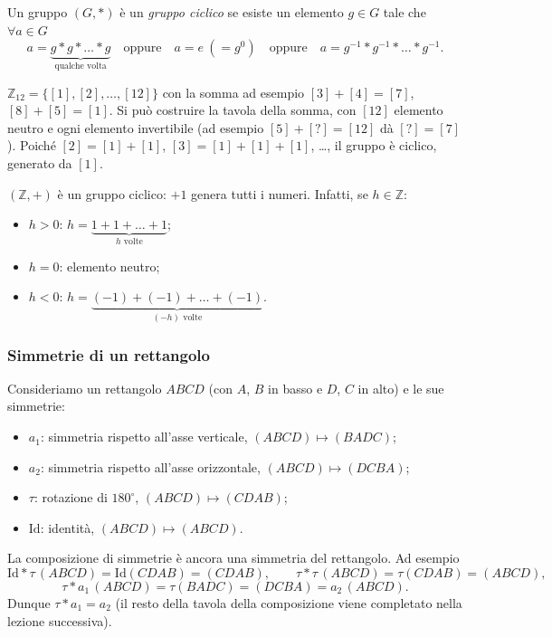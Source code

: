 \documentclass[11pt,a4paper]{article}
\begin{document}
\begin{definizione}
Un gruppo $(G, *)$ è un \emph{gruppo ciclico} se esiste un elemento $g \in G$ tale che $\forall a \in G$
\[
  a = \underbrace{g * g * \dots * g}_{\text{qualche volta}}
  \quad\text{oppure}\quad a = e\ (= g^0)
  \quad\text{oppure}\quad a = g^{-1} * g^{-1} * \dots * g^{-1} .
\]
\end{definizione}

\begin{esempio}
$\mathbb{Z}_{12} = \{[1], [2], \dots, [12]\}$ con la somma ad esempio $[3] + [4] = [7]$, $[8] + [5] = [1]$. Si può costruire la tavola della somma, con $[12]$ elemento neutro e ogni elemento invertibile (ad esempio $[5] + [?] = [12]$ dà $[?] = [7]$). Poiché $[2] = [1] + [1]$, $[3] = [1] + [1] + [1]$, \dots, il gruppo è ciclico, generato da $[1]$.
\end{esempio}

\begin{esempio}
$(\mathbb{Z}, +)$ è un gruppo ciclico: $+1$ genera tutti i numeri. Infatti, se $h \in \mathbb{Z}$:
\begin{itemize}
  \item $h > 0$: $h = \underbrace{1 + 1 + \dots + 1}_{h\text{ volte}}$;
  \item $h = 0$: elemento neutro;
  \item $h < 0$: $h = \underbrace{(-1) + (-1) + \dots + (-1)}_{(-h)\text{ volte}}$.
\end{itemize}
\end{esempio}

\subsubsection{Simmetrie di un rettangolo}

\begin{esempio}
Consideriamo un rettangolo $ABCD$ (con $A$, $B$ in basso e $D$, $C$ in alto) e le sue simmetrie:
\begin{itemize}
  \item $a_1$: simmetria rispetto all'asse verticale, $(ABCD) \mapsto (BADC)$;
  \item $a_2$: simmetria rispetto all'asse orizzontale, $(ABCD) \mapsto (DCBA)$;
  \item $\tau$: rotazione di $180^\circ$, $(ABCD) \mapsto (CDAB)$;
  \item $\mathrm{Id}$: identità, $(ABCD) \mapsto (ABCD)$.
\end{itemize}
La composizione di simmetrie è ancora una simmetria del rettangolo. Ad esempio
\[
  \mathrm{Id} * \tau\,(ABCD) = \mathrm{Id}(CDAB) = (CDAB), \qquad
  \tau * \tau\,(ABCD) = \tau(CDAB) = (ABCD),
\]
\[
  \tau * a_1\,(ABCD) = \tau(BADC) = (DCBA) = a_2\,(ABCD).
\]
Dunque $\tau * a_1 = a_2$ (il resto della tavola della composizione viene completato nella lezione successiva).
\end{esempio}
\end{document}

